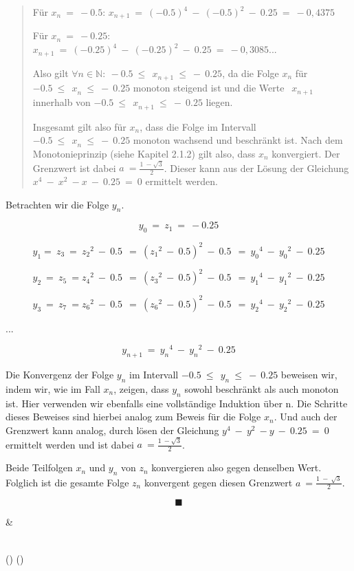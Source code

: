 \documentclass[a4paper, 12pt]{book}
\begin{document}
\begin{longtable}[]
\begin{minipage}[b]{\linewidth}
\begin{quote}
Für \(x_{n}\  = \  - 0.5\):
\(x_{n + 1}\  = \ {( - 0.5)}^{4}\  - \ {( - 0.5)}^{2}\  - \ 0.25\  = \  - 0,4375\)

Für \(x_{n}\  = \  - 0.25\):
\(x_{n + 1}\  = \ {( - 0.25)}^{4}\  - \ {( - 0.25)}^{2}\  - \ 0.25\  = \  - 0,3085...\)

Also gilt
\(\forall n \in \mathbb{N:\ } - 0.5\ {\leq \ \ x}_{n + 1}\  \leq \  - \ 0.25\),
da die Folge \(x_{n}\) für
\(- 0.5\ {\leq \ \ x}_{n}\  \leq \  - \ 0.25\) monoton steigend ist und
die Werte \({\ \ x}_{n + 1}\) innerhalb von
\(- 0.5\ {\leq \ \ x}_{n + 1}\  \leq \  - \ 0.25\) liegen.

Insgesamt gilt also für \(x_{n}\), dass die Folge im Intervall
\(- 0.5\ {\leq \ \ x}_{n}\  \leq \  - \ 0.25\) monoton wachsend und
beschränkt ist. Nach dem Monotonieprinzip (siehe Kapitel 2.1.2) gilt
also, dass \(x_{n}\) konvergiert. Der Grenzwert ist dabei
\(a\  = \frac{1\  - \sqrt{3}}{2}\). Dieser kann aus der Lösung der
Gleichung \(x^{4}\  - \ x^{2}\  - x\  - \ 0.25\  = \ 0\) ermittelt
werden.
\end{quote}

Betrachten wir die Folge \(y_{n}\).

\[y_{0}\  = \ z_{1}\  = \  - 0.25\]

\[y_{1}{= \ z}_{3}\  = \ {z_{2}}^{2}\  - \ 0.5\ \  = \ ({z_{1}}^{2}\  - \ 0.5)^{2}\  - \ 0.5\ \  = \ {y_{0}}^{4}\  - \ {y_{0}}^{2}\  - \ 0.25\]

\[y_{2}\  = \ z_{5}\  = {z_{4}}^{2}\  - \ 0.5\ \  = \ ({z_{3}}^{2}\  - \ 0.5)^{2}\  - \ 0.5\ \  = \ {y_{1}}^{4}\  - \ {y_{1}}^{2}\  - \ 0.25\]

\[y_{3}\  = \ z_{7}\  = {z_{6}}^{2}\  - \ 0.5\ \  = \ ({z_{6}}^{2}\  - \ 0.5)^{2}\  - \ 0.5\ \  = \ {y_{2}}^{4}\  - \ {y_{2}}^{2}\  - \ 0.25\]

...

\[y_{n + 1}\  = \ {y_{n}}^{4}\  - \ {y_{n}}^{2}\  - \ 0.25\]

Die Konvergenz der Folge \(y_{n}\) im Intervall
\(- 0.5\ {\leq \ \ y}_{n}\  \leq \  - \ 0.25\) beweisen wir, indem wir,
wie im Fall \(x_{n}\), zeigen, dass \(y_{n}\) sowohl beschränkt als auch
monoton ist. Hier verwenden wir ebenfalls eine vollständige Induktion
über n. Die Schritte dieses Beweises sind hierbei analog zum Beweis für
die Folge \(x_{n}\). Und auch der Grenzwert kann analog, durch lösen der
Gleichung \(y^{4}\  - \ y^{2}\  - y\  - \ 0.25\  = \ 0\) ermittelt
werden und ist dabei \(a\  = \frac{1\  - \sqrt{3}}{2}\).

Beide Teilfolgen \(x_{n}\) und \(y_{n}\) von \(z_{n}\) konvergieren also
gegen denselben Wert. Folglich ist die gesamte Folge \(z_{n}\)
konvergent gegen diesen Grenzwert \(a\  = \frac{1\  - \ \sqrt{3}}{2}\).

\[\blacksquare\]
\end{minipage} & \begin{minipage}[b]{\linewidth}\raggedright
\end{minipage} \\
\midrule()
\endhead
\bottomrule()
\end{longtable}
\end{document}
